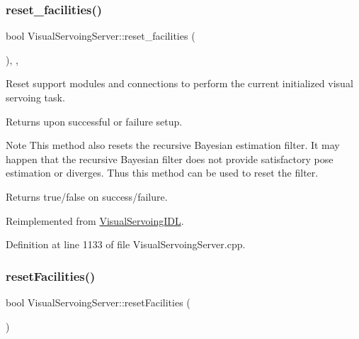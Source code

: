 \subsubsection{\texorpdfstring{reset\+\_\+facilities()}{reset\_facilities()}}
{\footnotesize\ttfamily bool Visual\+Servoing\+Server\+::reset\+\_\+facilities (\begin{DoxyParamCaption}{ }\end{DoxyParamCaption})\hspace{0.3cm}{\ttfamily [override]}, {\ttfamily [protected]}, {\ttfamily [virtual]}}



Reset support modules and connections to perform the current initialized visual servoing task. 

Returns upon successful or failure setup. \begin{DoxyNote}{Note}
This method also resets the recursive Bayesian estimation filter. It may happen that the recursive Bayesian filter does not provide satisfactory pose estimation or diverges. Thus this method can be used to reset the filter. 
\end{DoxyNote}
\begin{DoxyReturn}{Returns}
true/false on success/failure. 
\end{DoxyReturn}


Reimplemented from \hyperlink{classVisualServoingIDL_a23929f03db99f80426a859cdad68e48c}{Visual\+Servoing\+I\+DL}.



Definition at line 1133 of file Visual\+Servoing\+Server.\+cpp.

\mbox{\label{classVisualServoingServer_a39ea1de5ec159bd6779929c2bff84450}} 
\subsubsection{\texorpdfstring{reset\+Facilities()}{resetFacilities()}}
{\footnotesize\ttfamily bool Visual\+Servoing\+Server\+::reset\+Facilities (\begin{DoxyParamCaption}{ }\end{DoxyParamCaption})\hspace{0.3cm}{\ttfamily [override]}}




